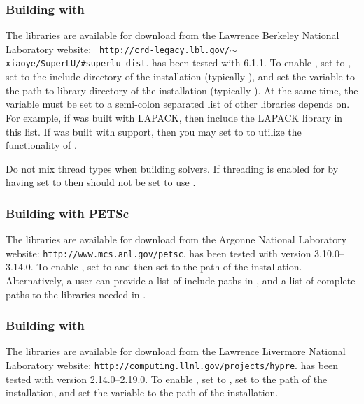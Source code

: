 \subsubsection*{Building with {\superludist}}
The {\superludist} libraries are available for download from the Lawrence
Berkeley National Laboratory website: {\tt
http://crd-legacy.lbl.gov/$\sim$xiaoye/SuperLU/\#superlu\_dist}.  {\sundials}
has been tested with {\superludist} 6.1.1.  To enable {\superludist}, set
 to , set  to the
include directory of the {\superludist} installation (typically ), and
set the variable \newline{} to the path to library
directory of the {\superludist} installation (typically ). At the same
time, the variable  must be set to a semi-colon
separated list of other libraries {\superludist} depends on. For example, if
{\superludist} was built with LAPACK, then include the LAPACK library in this
list.  If {\superludist} was built with {\openmp} support, then you may set
 to  to utilize the {\openmp} functionality of
{\superludist}.

\noindent Do not mix thread types when building {\sundials} solvers.  If
threading is enabled for {\sundials} by having  set to
 then {\superludist} should not be set to use {\openmp}.{\warn}

\subsubsection*{Building with PETSc}
\label{ss:building_with_petsc}
The {\petsc} libraries are available for download from the Argonne National
Laboratory website: {\tt http://www.mcs.anl.gov/petsc}. {\sundials} has been
tested with {\petsc} version 3.10.0--3.14.0. To enable {\petsc}, set
 to  and then set  to the path of the
{\petsc} installation. Alternatively, a user can provide a list of include paths
in , and a list of complete paths to the libraries needed in
.


\subsubsection*{Building with {\hypre}}
The {\hypre} libraries are available for download from the Lawrence Livermore
National Laboratory website: {\tt http://computing.llnl.gov/projects/hypre}.
{\sundials} has been tested with {\hypre} version 2.14.0--2.19.0.  To enable
{\hypre}, set   to , set  to
the  path of the {\hypre} installation, and set the variable
 to the  path of the {\hypre} installation.

